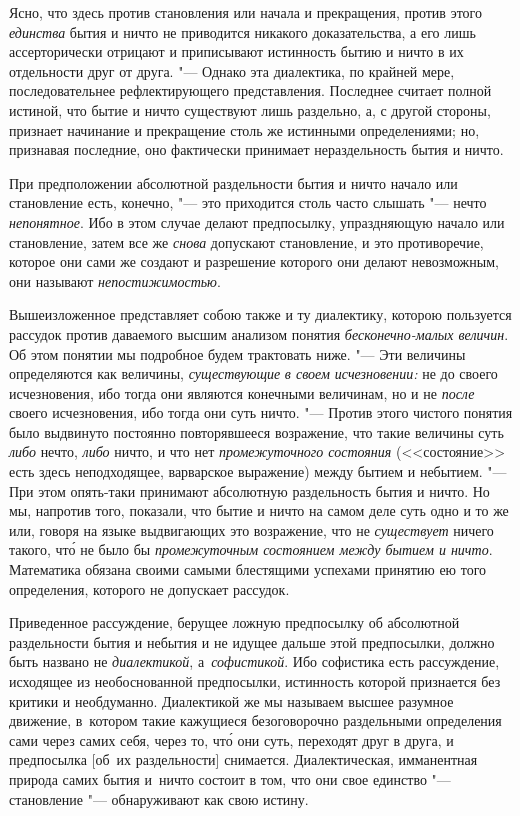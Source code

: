 Ясно, что здесь против становления или начала и прекращения, против этого {\em
единства} бытия и ничто не приводится никакого доказательства, а его лишь
ассерторически отрицают и приписывают истинность бытию и ничто в их отдельности
друг от друга. "--- Однако эта диалектика, по крайней мере, последовательнее
рефлектирующего представления. Последнее считает полной истиной, что бытие и
ничто существуют лишь раздельно, а, с другой стороны, признает начинание и
прекращение столь же истинными определениями; но, признавая последние, оно
фактически принимает нераздельность бытия и ничто.

При предположении абсолютной раздельности бытия и ничто начало или становление
есть, конечно, "--- это приходится столь часто слышать "--- нечто
{\em непонятное}. Ибо в этом случае делают предпосылку, упраздняющую начало
или становление, затем все же {\em снова} допускают становление, и это
противоречие, которое они сами же создают и разрешение которого они делают
невозможным, они называют {\em непостижимостью}.

Вышеизложенное представляет собою также и ту диалектику, которою пользуется
рассудок против даваемого высшим анализом понятия {\em бесконечно-малых
величин}. Об этом понятии мы подробное будем трактовать ниже. "--- Эти величины
определяются как величины, {\em существующие} {\em в своем исчезновении:} не до
своего исчезновения, ибо тогда они являются конечными величинам, но и не
{\em после} своего исчезновения, ибо тогда они суть ничто. "--- Против этого
чистого понятия было выдвинуто постоянно повторявшееся возражение, что такие
величины суть {\em либо} нечто, {\em либо} ничто, и что нет {\em промежуточного
состояния} (<<состояние>> есть здесь неподходящее, варварское выражение) между
бытием и небытием. "--- При этом опять-таки принимают абсолютную раздельность
бытия и ничто. Но мы, напротив того, показали, что бытие и ничто на самом деле
суть одно и то же или, говоря на языке выдвигающих это возражение, что не
{\em существует} ничего такого, чт\'{о} не было бы {\em промежуточным
состоянием между бытием и ничто}. Математика обязана своими самыми блестящими
успехами принятию ею того определения, которого не допускает рассудок.

Приведенное рассуждение, берущее ложную предпосылку об абсолютной раздельности
бытия и небытия и не идущее дальше этой предпосылки, должно быть названо не
{\em диалектикой}, а~{\em софистикой}. Ибо софистика есть рассуждение,
исходящее из необоснованной предпосылки, истинность которой признается без
критики и необдуманно. Диалектикой же мы называем высшее разумное движение,
в~котором такие кажущиеся безоговорочно раздельными определения сами через
самих себя, через то, чт\'{о} они суть, переходят друг в друга, и предпосылка
[об~их раздельности] снимается. Диалектическая, имманентная природа самих бытия
и~ничто состоит в том, что они свое единство "--- становление "--- обнаруживают
как свою истину.

